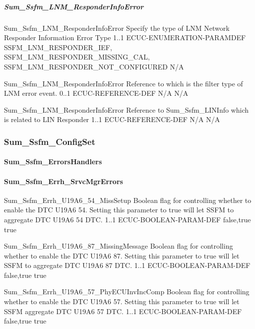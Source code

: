 \subparagraph{Sum_Ssfm_LNM_ResponderInfoError}

{Sum_Ssfm_LNM_ResponderInfoError}
{Specify the type of LNM Network Responder Information Error Type}
{1..1}
{ECUC-ENUMERATION-PARAMDEF}
{SSFM_LNM_RESPONDER_IEF, SSFM_LNM_RESPONDER_MISSING_CAL, SSFM_LNM_RESPONDER_NOT_CONFIGURED}
{N/A}

{Sum_Ssfm_LNM_ResponderInfoError}
{Reference to  which is the filter type of LNM error event.}
{0..1}
{ECUC-REFERENCE-DEF}
{N/A}
{N/A}

{Sum_Ssfm_LNM_ResponderInfoError}
{Reference to Sum_Ssfm_LINInfo which is related to LIN Responder}
{1..1}
{ECUC-REFERENCE-DEF}
{N/A}
{N/A}

{  }
\subsubsection{Sum_Ssfm_ConfigSet}
\paragraph{Sum_Ssfm_ErrorsHandlers}


\paragraph{Sum_Ssfm_Errh_SrvcMgrErrors}

{Sum_Ssfm_Errh_U19A6_54_MissSetup}
{Boolean flag for controlling whether to enable the DTC U19A6 54. Setting this parameter to true will let SSFM to aggregate DTC U19A6 54 DTC.}
{1..1}
{ECUC-BOOLEAN-PARAM-DEF}
{false,true}
{true}

{Sum_Ssfm_Errh_U19A6_87_MissingMessage}
{Boolean flag for controlling whether to enable the DTC U19A6 87. Setting this parameter to true will let SSFM to aggregate DTC U19A6 87 DTC.}
{1..1}
{ECUC-BOOLEAN-PARAM-DEF}
{false,true}
{true}

{} 

{Sum_Ssfm_Errh_U19A6_57_PhyECUInvIncComp}
{Boolean flag for controlling whether to enable the DTC U19A6 57. Setting this parameter to true will let SSFM aggregate DTC U19A6 57 DTC.}
{1..1}
{ECUC-BOOLEAN-PARAM-DEF}
{false,true}
{true}


